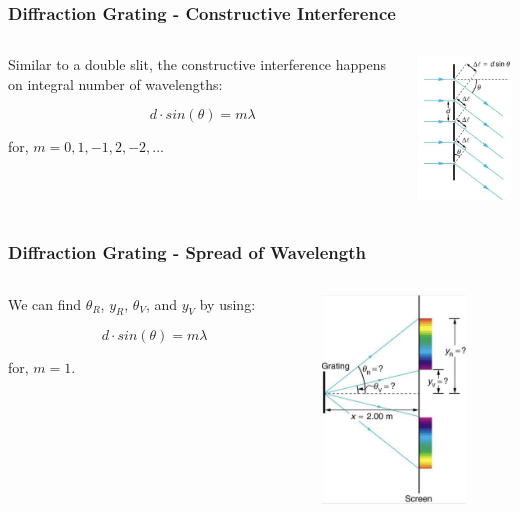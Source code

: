 \documentclass{beamer}
\begin{document}
\begin{frame}\frametitle{Diffraction Grating - Constructive Interference}
\begin{columns}
\begin{column}{7cm}
Similar to a double slit, the constructive interference happens on integral number of wavelengths:

\[d \cdot sin(\theta) = m \lambda \]

for, $m = 0, 1 , -1, 2, -2, ...$


\end{column}
\begin{column}{4cm}
\begin{center}
\includegraphics[width=3.8cm]{fig/dg2.jpg}
\end{center}
\end{column}
\end{columns}
\end{frame}

\begin{frame}\frametitle{Diffraction Grating - Spread of Wavelength}
\begin{columns}
\begin{column}{7cm}
We can find $\theta_R$, $y_R$, $\theta_V$, and $y_V$ by using:

\[d \cdot sin(\theta) = m \lambda \]

for, $m = 1$.


\end{column}
\begin{column}{4cm}
\begin{center}
\includegraphics[width=3.8cm]{fig/dg3.jpg}
\end{center}
\end{column}
\end{columns}
\end{frame}
\end{document}
